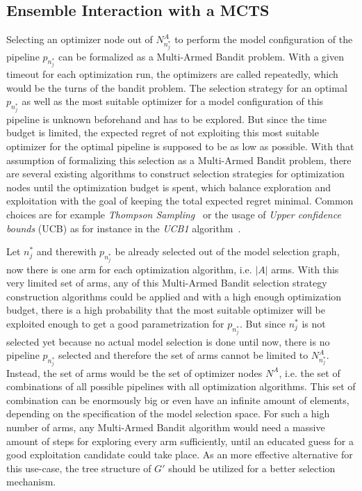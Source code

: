 \subsection{Ensemble Interaction with a MCTS}
\label{sec:approach:selection:mcts}
Selecting an optimizer node out of $N^A_{n^*_j}$ to perform the model configuration of the pipeline $p_{n^*_j}$ can be formalized as a Multi-Armed Bandit problem.
With a given timeout for each optimization run, the optimizers are called repeatedly, which would be the turns of the bandit problem.
The selection strategy for an optimal $p_{n^*_j}$ as well as the most suitable optimizer for a model configuration of this pipeline is unknown beforehand and has to be explored.
But since the time budget is limited, the expected regret of not exploiting this most suitable optimizer for the optimal pipeline is supposed to be as low as possible.\newline
With that assumption of formalizing this selection as a Multi-Armed Bandit problem, there are several existing algorithms to construct selection strategies for optimization nodes until the optimization budget is spent, which balance exploration and exploitation with the goal of keeping the total expected regret minimal.
Common choices are for example \textit{Thompson Sampling}~\cite{Thompson-Sampling} or the usage of \textit{Upper confidence bounds} (UCB) as for instance in the \textit{UCB1} algorithm~\cite{Auer-UCB1}.

Let $n^*_j$ and therewith $p_{n^*_j}$ be already selected out of the model selection graph, now there is one arm for each optimization algorithm, i.e. $|A|$ arms.
With this very limited set of arms, any of this Multi-Armed Bandit selection strategy construction algorithms could be applied and with a high enough optimization budget, there is a high probability that the most suitable optimizer will be exploited enough to get a good parametrization for $p_{n^*_j}$.\newline
But since $n^*_j$ is not selected yet because no actual model selection is done until now, there is no pipeline $p_{n^*_j}$ selected and therefore the set of arms cannot be limited to $N^A_{n^*_j}$.
Instead, the set of arms would be the set of optimizer nodes $N^A$, i.e. the set of combinations of all possible pipelines with all optimization algorithms.
This set of combination can be enormously big or even have an infinite amount of elements, depending on the specification of the model selection space.
For such a high number of arms, any Multi-Armed Bandit algorithm would need a massive amount of steps for exploring every arm sufficiently, until an educated guess for a good exploitation candidate could take place.
As an more effective alternative for this use-case, the tree structure of $G'$ should be utilized for a better selection mechanism.

